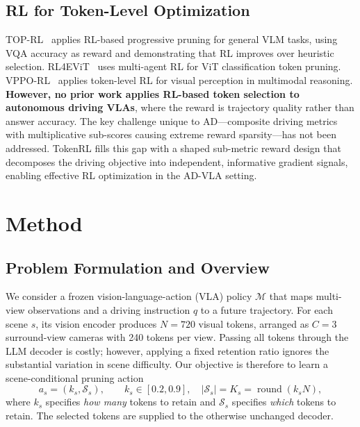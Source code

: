 \documentclass[letterpaper]{article} %
\newcommand{\ours}{TokenRL}
\begin{document}
\subsection{RL for Token-Level Optimization}

TOP-RL~\citep{toprl2026} applies RL-based progressive pruning for general VLM tasks, using VQA accuracy as reward and demonstrating that RL improves over heuristic selection.
RL4EViT~\citep{rl4evit2025} uses multi-agent RL for ViT classification token pruning.
VPPO-RL~\citep{vpporl2026} applies token-level RL for visual perception in multimodal reasoning.
\textbf{However, no prior work applies RL-based token selection to autonomous driving VLAs}, where the reward is trajectory quality rather than answer accuracy.
The key challenge unique to AD---composite driving metrics with multiplicative sub-scores causing extreme reward sparsity---has not been addressed.
\ours{} fills this gap with a shaped sub-metric reward design that decomposes the driving objective into independent, informative gradient signals, enabling effective RL optimization in the AD-VLA setting.

\section{Method}
\label{sec:method}

\subsection{Problem Formulation and Overview}

We consider a frozen vision-language-action (VLA) policy $\mathcal{M}$ that maps multi-view observations and a driving instruction $q$ to a future trajectory. For each scene $s$, its vision encoder produces $N{=}720$ visual tokens, arranged as $C{=}3$ surround-view cameras with 240 tokens per view. Passing all tokens through the LLM decoder is costly; however, applying a fixed retention ratio ignores the substantial variation in scene difficulty. Our objective is therefore to learn a scene-conditional pruning action
\begin{equation}
    a_s = (k_s,\mathcal{S}_s), \qquad
    k_s \in [0.2,0.9], \quad
    |\mathcal{S}_s| = K_s = \operatorname{round}(k_sN),
\end{equation}
where $k_s$ specifies \emph{how many} tokens to retain and $\mathcal{S}_s$ specifies \emph{which} tokens to retain. The selected tokens are supplied to the otherwise unchanged decoder.
\end{document}
